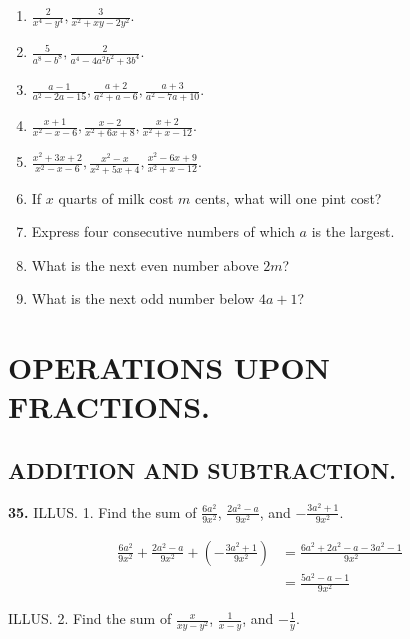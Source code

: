 \documentclass{book}
\begin{document}
\begin{enumerate}
\item $\displaystyle \frac{2}{x^4-y^4}, \frac{3}{x^2 + xy -
2y^2}.$

\item $\displaystyle \frac{5}{a^8-b^8}, \frac{2}{a^4 - 4a^2b^2 +
3b^4}.$

\item $\displaystyle \frac{a-1}{a^2-2a-15}, \frac{a+2}{a^2+a-6},
\frac{a+3}{a^2-7a+10}.$

\item $\displaystyle \frac{x+1}{x^2-x-6}, \frac{x-2}{x^2+6x+8},
\frac{x+2}{x^2+x-12}.$

\item $\displaystyle \frac{x^2+3x+2}{x^2-x-6},
\frac{x^2-x}{x^2+5x+4}, \frac{x^2-6x+9}{x^2+x-12}.$

\item If $x$ quarts of milk cost $m$ cents, what will one pint
cost?

\item Express four consecutive numbers of which $a$ is the
largest.

\item What is the next even number above $2m$?

\item What is the next odd number below $4a+1$?

\end{enumerate}

\section*{OPERATIONS UPON FRACTIONS.}

\subsection*{ADDITION AND SUBTRACTION.}

\textbf{35.} ILLUS. 1. Find the sum of $\frac{6a^2}{9x^2}$,
$\frac{2a^2-a}{9x^2}$, and $-\frac{3a^2+1}{9x^2}$.

\begin{align*}
\frac{6a^2}{9x^2} + \frac{2a^2-a}{9x^2} + \left(-\frac{3a^2+1}{9x^2}\right)&=\frac{6a^2 + 2a^2 - a - 3a^2 - 1}{9x^2}\\
&= \frac{5a^2 - a - 1}{9x^2}
\end{align*}


ILLUS. 2. Find the sum of $\frac{x}{xy-y^2}$, $\frac{1}{x-y}$, and
$-\frac{1}{y}$.
\end{document}
